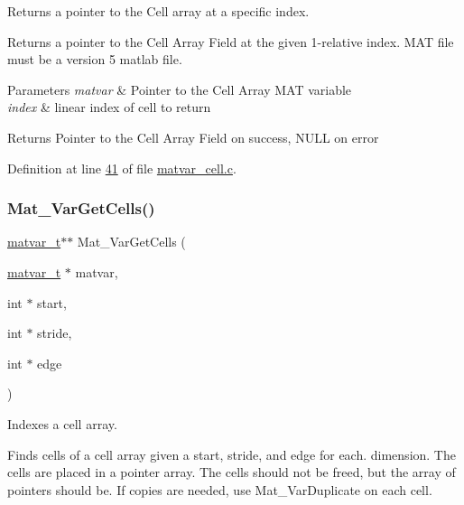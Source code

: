 Returns a pointer to the Cell array at a specific index. 

Returns a pointer to the Cell Array Field at the given 1-\/relative index. M\+AT file must be a version 5 matlab file.


\begin{DoxyParams}{Parameters}
{\em matvar} & Pointer to the Cell Array M\+AT variable \\
\hline
{\em index} & linear index of cell to return \\
\hline
\end{DoxyParams}
\begin{DoxyReturn}{Returns}
Pointer to the Cell Array Field on success, N\+U\+LL on error 
\end{DoxyReturn}


Definition at line \hyperlink{matvar__cell_8c_source_l00041}{41} of file \hyperlink{matvar__cell_8c_source}{matvar\+\_\+cell.\+c}.

\mbox{\label{group___m_a_t_ga0732b0a6c40975b036068b9a14422d45}} 
\subsubsection{\texorpdfstring{Mat\+\_\+\+Var\+Get\+Cells()}{Mat\_VarGetCells()}}
{\footnotesize\ttfamily \hyperlink{group___m_a_t_structmatvar__t}{matvar\+\_\+t}$\ast$$\ast$ Mat\+\_\+\+Var\+Get\+Cells (\begin{DoxyParamCaption}\item[{\hyperlink{group___m_a_t_structmatvar__t}{matvar\+\_\+t} $\ast$}]{matvar,  }\item[{int $\ast$}]{start,  }\item[{int $\ast$}]{stride,  }\item[{int $\ast$}]{edge }\end{DoxyParamCaption})}



Indexes a cell array. 

Finds cells of a cell array given a start, stride, and edge for each. dimension. The cells are placed in a pointer array. The cells should not be freed, but the array of pointers should be. If copies are needed, use Mat\+\_\+\+Var\+Duplicate on each cell.


